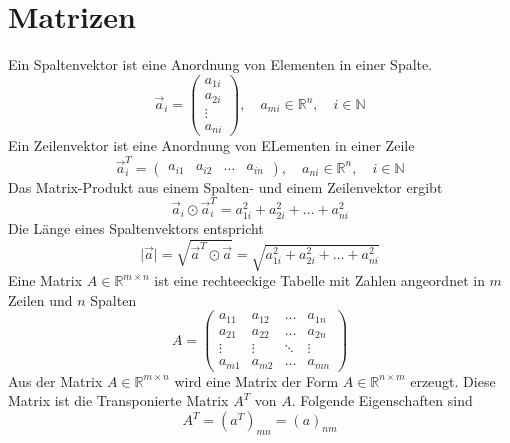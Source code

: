 \section{Matrizen}
Ein Spaltenvektor ist eine Anordnung von Elementen in einer Spalte.
\begin{equation}
\boxed{\overrightarrow{a}_i=\begin{pmatrix}a_{1i}\\a_{2i}\\\vdots\\a_{ni}\end{pmatrix},\quad a_{mi}\in \mathbb{R}^n, \quad i\in \mathbb{N}}
\end{equation}
Ein Zeilenvektor ist eine Anordnung von ELementen in einer Zeile
\begin{equation}
\boxed{\overrightarrow{a}_i^T=\begin{pmatrix}a_{i1}&a_{i2}&\dotso&a_{in}\end{pmatrix},\quad a_{ni}\in \mathbb{R}^n,\quad i\in\mathbb{N}}
\end{equation}
Das Matrix-Produkt aus einem Spalten- und einem Zeilenvektor ergibt
\begin{equation}
\boxed{\overrightarrow{a}_i\odot \overrightarrow{a}_i^T=a_{1i}^2+a_{2i}^2+\dotso+a_{ni}^2}
\end{equation}
Die Länge eines Spaltenvektors entspricht
\begin{equation}
\boxed{\Big\vert\overrightarrow{a}\Big\vert=\sqrt{\overrightarrow{a}^T\odot \overrightarrow{a}}=\sqrt{a_{1i}^2+a_{2i}^2+\dotso+a_{ni}^2}}
\end{equation}
Eine Matrix $A\in\mathbb{R}^{m\times n}$ ist eine rechteeckige Tabelle mit Zahlen angeordnet in $m$ Zeilen und $n$ Spalten
\begin{equation}
\boxed{A=\begin{pmatrix}a_{11}&a_{12}&\dotso&a_{1n}\\a_{21}&a_{22}&\dotso&a_{2n}\\\vdots&\vdots&\ddots&\vdots\\a_{m1}&a_{m2}&\dotso&a_{mn}\end{pmatrix}}
\end{equation}
Aus der Matrix $A\in\mathbb{R}^{m\times n}$ wird eine Matrix der Form $A\in\mathbb{R}^{n\times m}$ erzeugt. Diese Matrix ist die Transponierte Matrix $A^T$ von $A$. Folgende Eigenschaften sind
\begin{equation}
\boxed{A^T=\left(a^T\right)_{mn}=\left(a\right)_{nm}}
\end{equation}
